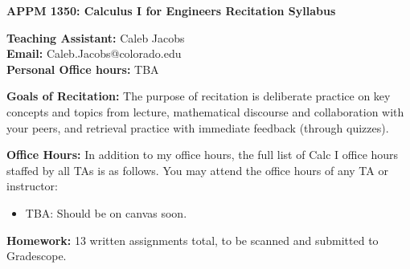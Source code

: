 \documentclass[10pt]{report}
\begin{document}
\begin{center}
    \textbf{APPM 1350: Calculus I for Engineers Recitation Syllabus}

    \textbf{Teaching Assistant:} Caleb Jacobs \\
    \textbf{Email:} Caleb.Jacobs@colorado.edu \\
    \textbf{Personal Office hours:} TBA
\end{center}

\textbf{Goals of Recitation:} The purpose of recitation is deliberate practice on key concepts and topics from lecture, mathematical discourse and collaboration with your peers, and retrieval practice with immediate feedback (through quizzes).

\textbf{Office Hours:} In addition to my office hours, the full list of Calc I office hours staffed by all TAs is as follows. You may attend the office hours of any TA or instructor:
\begin{itemize}[topsep = 0pt]
	\item TBA: Should be on canvas soon.
\end{itemize}

\textbf{Homework:} 13 written assignments total, to be scanned and submitted to Gradescope.
\end{document}
